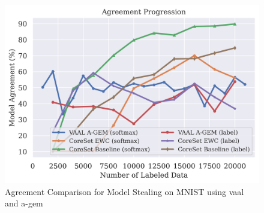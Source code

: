 \begin{figure}[!htb]
    \centering
    \includegraphics[width=0.5\linewidth]{images/results_CALMS/mnist_vaal_agem.png}
    \caption{Agreement Comparison for Model Stealing on MNIST using \gls{vaal} and \gls{a-gem}}
    \label{fig:CALMSmnistVAAL_AGEM}
\end{figure}

